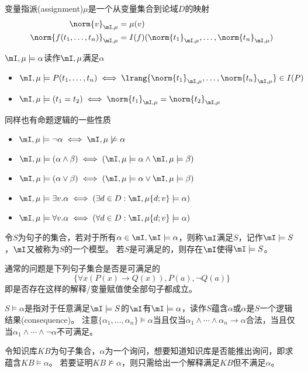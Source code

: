 \begin{definition}[赋值(denotation)]
变量指派(assignment)$\mu$是一个从变量集合到论域$D$的映射
\[\begin{aligned}
\norm{v}_{\mI,\mu}&=\mu(v)\\
\norm{f(t_1,\ldots,t_n)}_{\mI,\mu}&=I(f)(\norm{t_1}_{\mI,\mu},\ldots,\norm{t_n}_{\mI,\mu})
\end{aligned}\]
\end{definition}
\begin{definition}[满足]
$\mI,\mu\models\alpha$读作$\mI,\mu$满足$\alpha$
\begin{itemize}
	\item $\mI,\mu\models P(t_1,\ldots,t_n)\iff\lrang{\norm{t_1}_{\mI,\mu},\ldots,\norm{t_n}_{\mI,\mu}}\in I(P)$
	\item $\mI,\mu\models(t_1=t_2)\iff\norm{t_1}_{\mI,\mu}=\norm{t_2}_{\mI,\mu}$
\end{itemize}
同样也有命题逻辑的一些性质
\begin{itemize}
	\item $\mI,\mu\models\lnot\alpha\iff\mI,\mu\not\models\alpha$
	\item $\mI,\mu\models(\alpha\land\beta)\iff(\mI,\mu\models\alpha\land\mI,\mu\models\beta)$
	\item $\mI,\mu\models(\alpha\lor\beta)\iff(\mI,\mu\models\alpha\lor\mI,\mu\models\beta)$
	\item $\mI,\mu\models\exists v.\alpha\iff(\exists d\in D:\mI,\mu\{d;v\}\models\alpha)$
	\item $\mI,\mu\models\forall v.\alpha\iff(\forall d\in D:\mI,\mu\{d;v\}\models\alpha)$
\end{itemize}

令$S$为句子的集合，若对于所有$\alpha\in\mI,\mI\models\alpha$，则称$\mI$满足$S$，记作$\mI\models S$，$\mI$又被称为$S$的一个模型。
若$S$是可满足的，则存在$\mI$使得$\mI\models S$。
\end{definition}
\begin{example}
通常的问题是下列句子集合是否是可满足的
\[\{\forall x(P(x)\to Q(x)),P(a),\lnot Q(a)\}\]
即是否存在这样的解释/变量赋值使全部句子都成立。
\end{example}

\begin{definition}[蕴含(entail)]
$S\models\alpha$是指对于任意满足$\mI\models S$的$\mI$有$\mI\models\alpha$，读作$S$蕴含$\alpha$或$\alpha$是$S$一个逻辑结果(consequence)。
注意$\{\alpha_1,\ldots,\alpha_n\}\models\alpha$当且仅当$\alpha_1\land\cdots\land\alpha_n\to\alpha$合法，当且仅当$\alpha_1\land\cdots\land\lnot\alpha$不可满足。
\end{definition}
\begin{example}
令知识库$KB$为句子集合，$\alpha$为一个询问，想要知道知识库是否能推出询问，即求蕴含$KB\models\alpha$。
若要证明$KB\not\models\alpha$，则只需给出一个解释满足$KB$但不满足$\alpha$。
\end{example}

